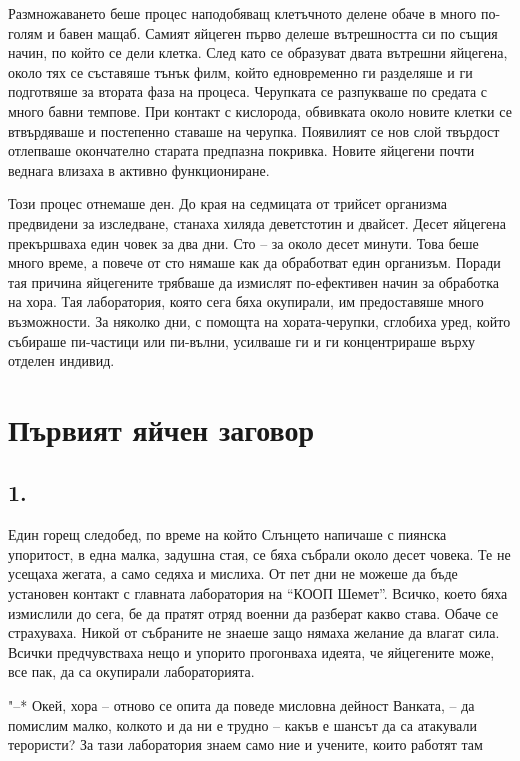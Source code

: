 \documentclass[ebook,openany,12pt]{memoir}
\begin{document}
Размножаването беше процес наподобяващ клетъчното делене обаче в много по-голям и бавен мащаб. Самият яйцеген първо делеше вътрешността си по същия начин, по който се дели клетка. След като се образуват двата вътрешни яйцегена, около тях се съставяше тънък филм, който едновременно ги разделяше и ги подготвяше за втората фаза на процеса. Черупката се разпукваше по средата с много бавни темпове. При контакт с кислорода, обвивката около новите клетки се втвърдяваше и постепенно ставаше на черупка. Появилият се нов слой твърдост отлепваше окончателно старата предпазна покривка. Новите яйцегени почти веднага влизаха в активно функциониране. 

Този процес отнемаше ден. До края на седмицата от трийсет организма предвидени за изследване, станаха хиляда деветстотин и двайсет. Десет яйцегена прекършваха един човек за два дни. Сто – за около десет минути. Това беше много време, а повече от сто нямаше как да обработват един организъм. Поради тая причина яйцегените трябваше да измислят по-ефективен начин за обработка на хора. Тая лаборатория, която сега бяха окупирали, им предоставяше много възможности. За няколко дни, с помощта на хората-черупки, сглобиха уред, който събираше пи-частици или пи-вълни, усилваше ги и ги концентрираше върху отделен индивид.

\chapter{Първият яйчен заговор}

\section*{1.}

Един горещ следобед, по време на който Слънцето напичаше с пиянска упоритост, в една малка, задушна стая, се бяха събрали около десет човека. Те не усещаха жегата, а само седяха и мислиха. От пет дни не можеше да бъде установен контакт с главната лаборатория на ``КООП Шемет''. Всичко, което бяха измислили до сега, бе да пратят отряд военни да разберат какво става. Обаче се страхуваха. Никой от събраните не знаеше защо нямаха желание да влагат сила. Всички предчувстваха нещо и упорито прогонваха идеята, че яйцегените може, все пак, да са окупирали лабораторията.

"--* Окей, хора -- отново се опита да поведе мисловна дейност Ванката, – да помислим малко, колкото и да ни е трудно – какъв е шансът да са атакували терористи? За тази лаборатория знаем само ние и учените, които работят там
\end{document}
